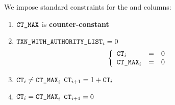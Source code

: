 We impose standard constraints for the \ct{} and \maxCt{} columns:
\begin{enumerate}
	\item $\texttt{CT\_MAX}$ is \textbf{counter-constant}
	\item \If $\texttt{TXN\_WITH\_AUTHORITY\_LIST} _{i} = 0$ \Then
		\[
			\left\{ \begin{array}{lclr}
				\texttt{CT}    _{i} & = & 0 \\
				\texttt{CT\_MAX} _{i} & = & 0 \\
			\end{array} \right.
		\]
	\item \If $\texttt{CT} _{i} \neq \texttt{CT\_MAX} _{i}$ \Then $\texttt{CT} _{i + 1} = 1 + \texttt{CT} _{i}$
	\item \If $\texttt{CT} _{i} =    \texttt{CT\_MAX} _{i}$ \Then $\texttt{CT} _{i + 1} = 0$
\end{enumerate}
